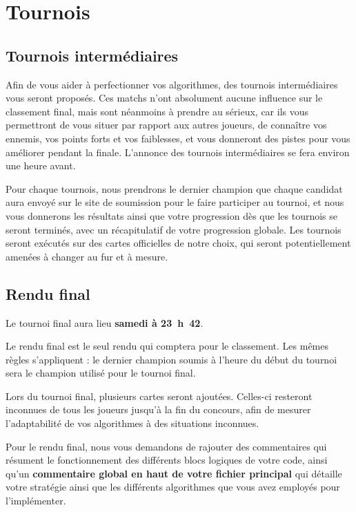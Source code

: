 
\section{Tournois}

\subsection{Tournois intermédiaires}

Afin de vous aider à perfectionner vos algorithmes, des tournois intermédiaires
vous seront proposés. Ces matchs n'ont absolument aucune influence sur le
classement final, mais sont néanmoins à prendre au sérieux, car ils vous
permettront de vous situer par rapport aux autres joueurs, de connaître vos
ennemis, vos points forts et vos faiblesses, et vous donneront des pistes pour
vous améliorer pendant la finale. L'annonce des tournois intermédiaires se fera
environ une heure avant.

Pour chaque tournois, nous prendrons le dernier champion que chaque candidat
aura envoyé sur le site de soumission pour le faire participer au tournoi, et
nous vous donnerons les résultats ainsi que votre progression dès que les
tournois se seront terminés, avec un récapitulatif de votre progression
globale. Les tournois seront exécutés sur des cartes officielles de notre
choix, qui seront potentiellement amenées à changer au fur et à mesure.

\subsection{Rendu final}

Le tournoi final aura lieu \textbf{samedi à 23~h~42}.

Le rendu final est le seul rendu qui comptera pour le classement. Les mêmes
règles s'appliquent : le dernier champion soumis à l'heure du début du tournoi
sera le champion utilisé pour le tournoi final.

Lors du tournoi final, plusieurs cartes seront ajoutées. Celles-ci resteront
inconnues de tous les joueurs jusqu'à la fin du concours, afin de mesurer
l'adaptabilité de vos algorithmes à des situations inconnues.

Pour le rendu final, nous vous demandons de rajouter des commentaires qui
résument le fonctionnement des différents blocs logiques de votre code, ainsi
qu'un \textbf{commentaire global en haut de votre fichier principal} qui
détaille votre stratégie ainsi que les différents algorithmes que vous avez
employés pour l'implémenter.

